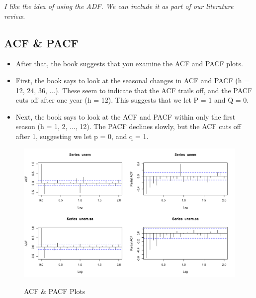 {      \textit{I like the idea of using the ADF. We can include it as part of our literature review.}
      
      
     
  

  
  \subsection*{ACF \& PACF}
  \begin{itemize}
  	\item  After that, the book suggests that you examine the ACF and PACF plots.
  	 \item First, the book says to look at the seasonal changes in ACF and PACF (h = 12, 24, 36, ...). These seem to indicate that the ACF trails off, and the PACF cuts off after one year (h = 12). This suggests that we let P = 1 and Q = 0.
  	 \item Next, the book says to look at the ACF and PACF within only the first season (h = 1, 2, ..., 12). The PACF declines slowly, but the ACF cuts off after 1, suggesting we let p = 0, and q = 1.
  \end{itemize}
  
  



      \begin{figure}[H]
      	\centering
      	\caption{ACF \& PACF Plots}
      	\includegraphics[width=\linewidth]{images/acfpacf}
      	\label{fig:secdiff2}
      \end{figure}

}
